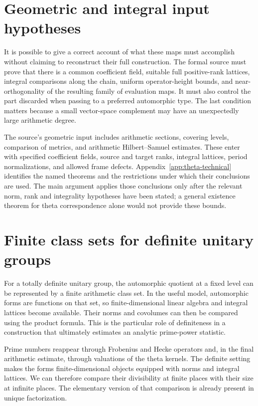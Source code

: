 \documentclass[11pt,openany,oneside]{scrbook}
\theoremstyle{definition}
\theoremstyle{remark}
\begin{document}
\section{Geometric and integral input hypotheses}\label{sec:theta-input-boundary}

It is possible to give a correct account of what these maps must accomplish without claiming to reconstruct their full construction.  The formal source must prove that there is a common coefficient field, suitable full positive-rank lattices, integral comparisons along the chain, uniform operator-height bounds, and near-orthogonality of the resulting family of evaluation maps.  It must also control the part discarded when passing to a preferred automorphic type.  The last condition matters because a small vector-space complement may have an unexpectedly large arithmetic degree.

The source's geometric input includes arithmetic sections, covering levels, comparison of metrics, and arithmetic Hilbert--Samuel estimates. These enter with specified coefficient fields, source and target ranks, integral lattices, period normalizations, and allowed frame defects. Appendix~\ref{app:theta-technical} identifies the named theorems and the restrictions under which their conclusions are used. The main argument applies those conclusions only after the relevant norm, rank and integrality hypotheses have been stated; a general existence theorem for theta correspondence alone would not provide these bounds.

\section{Finite class sets for definite unitary groups}

For a totally definite unitary group, the automorphic quotient at a fixed level can be represented by a finite arithmetic class set. In the useful model, automorphic forms are functions on that set, so finite-dimensional linear algebra and integral lattices become available. Their norms and covolumes can then be compared using the product formula. This is the particular role of definiteness in a construction that ultimately estimates an analytic prime-power statistic.

Prime numbers reappear through Frobenius and Hecke operators and, in the final arithmetic estimate, through valuations of the theta kernels. The definite setting makes the forms finite-dimensional objects equipped with norms and integral lattices. We can therefore compare their divisibility at finite places with their size at infinite places. The elementary version of that comparison is already present in unique factorization.
\end{document}
